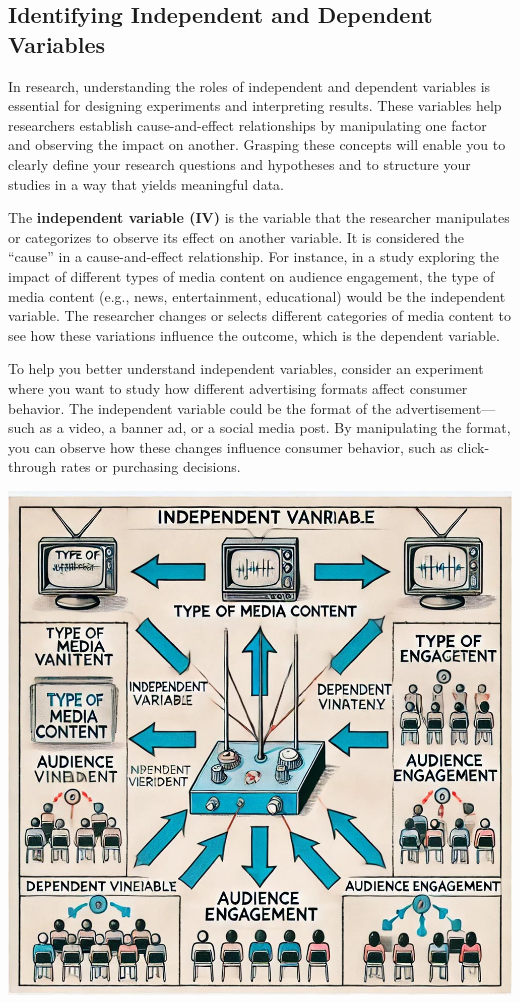 \documentclass[
]{book}
\begin{document}
\subsection{Identifying Independent and Dependent Variables}\label{identifying-independent-and-dependent-variables}

In research, understanding the roles of independent and dependent variables is essential for designing experiments and interpreting results. These variables help researchers establish cause-and-effect relationships by manipulating one factor and observing the impact on another. Grasping these concepts will enable you to clearly define your research questions and hypotheses and to structure your studies in a way that yields meaningful data.

The \textbf{independent variable (IV)} is the variable that the researcher manipulates or categorizes to observe its effect on another variable. It is considered the ``cause'' in a cause-and-effect relationship. For instance, in a study exploring the impact of different types of media content on audience engagement, the type of media content (e.g., news, entertainment, educational) would be the independent variable. The researcher changes or selects different categories of media content to see how these variations influence the outcome, which is the dependent variable.

To help you better understand independent variables, consider an experiment where you want to study how different advertising formats affect consumer behavior. The independent variable could be the format of the advertisement---such as a video, a banner ad, or a social media post. By manipulating the format, you can observe how these changes influence consumer behavior, such as click-through rates or purchasing decisions.

\includegraphics[width=1\linewidth,height=\textheight,keepaspectratio]{images/fig023.jpg}
\end{document}
